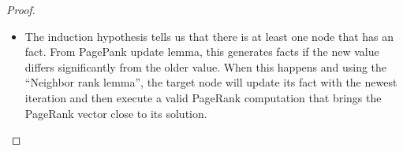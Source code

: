\begin{proof}
\begin{itemize}
   \item The induction hypothesis tells us that there is at least one node that
      has an  fact. From PagePank update lemma, this generates
       facts if the new value differs significantly from
      the older value. When this happens and using the ``Neighbor rank lemma'',
      the target node will update its  fact with the
      newest iteration and then execute a valid PageRank computation that brings
      the PageRank vector close to its solution.

\end{itemize}

\end{proof}
